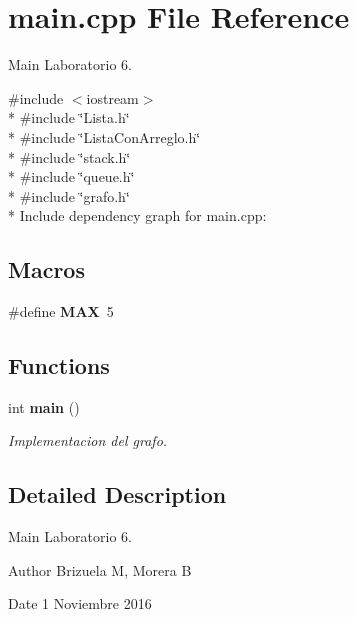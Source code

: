 \section{main.\+cpp File Reference}
\label{main_8cpp}


Main Laboratorio 6.  


{\ttfamily \#include $<$iostream$>$}\\*
{\ttfamily \#include \char`\"{}Lista.\+h\char`\"{}}\\*
{\ttfamily \#include \char`\"{}Lista\+Con\+Arreglo.\+h\char`\"{}}\\*
{\ttfamily \#include \char`\"{}stack.\+h\char`\"{}}\\*
{\ttfamily \#include \char`\"{}queue.\+h\char`\"{}}\\*
{\ttfamily \#include \char`\"{}grafo.\+h\char`\"{}}\\*
Include dependency graph for main.\+cpp\+:
\subsection*{Macros}
\begin{DoxyCompactItemize}
\item 
\#define {\bfseries M\+AX}~5\label{main_8cpp_a392fb874e547e582e9c66a08a1f23326}

\end{DoxyCompactItemize}
\subsection*{Functions}
\begin{DoxyCompactItemize}
\item 
int {\bf main} ()
\begin{DoxyCompactList}\small\item\em Implementacion del grafo. \end{DoxyCompactList}\end{DoxyCompactItemize}


\subsection{Detailed Description}
Main Laboratorio 6. 

\begin{DoxyAuthor}{Author}
Brizuela M, Morera B 
\end{DoxyAuthor}
\begin{DoxyDate}{Date}
1 Noviembre 2016 
\end{DoxyDate}


